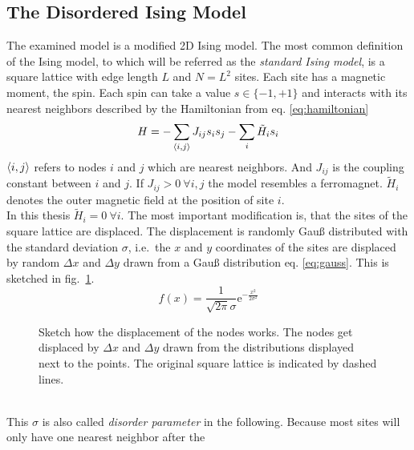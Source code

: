 \subsection{The Disordered Ising Model}
\label{ssec:isingmodel}
    The examined model is a modified 2D Ising model.
    The most common definition of the Ising model, to which will be referred
    as the \emph{standard Ising model}, is a square lattice with edge length \(L\) and
    \(N=L^2\) sites. Each site has a magnetic moment, the spin. Each
    spin can take a value \(s \in \{-1,+1\}\) and interacts with its
    nearest neighbors described by the Hamiltonian from eq. \eqref{eq:hamiltonian}
    \begin{equation}
        H = - \sum_{\left< i,j \right>}J_{ij}s_{i}s_{j} - \sum_i \tilde{H}_i s_i
        \label{eq:hamiltonian}
    \end{equation}
    \(\left< i,j \right>\) refers to nodes \(i\) and \(j\) which are nearest
    neighbors. And \(J_{ij}\) is the coupling constant between \(i\) and
    \(j\). If \(J_{ij} > 0 \ \forall i,j\) the model resembles a ferromagnet.
    \(\tilde{H}_i\) denotes the outer magnetic field at the position of
    site \(i\).\\
    In this thesis \(\tilde{H}_i=0 \ \forall i\). The most important
    modification is, that the sites of the square lattice are displaced.
    The displacement is randomly Gauß distributed with the standard
    deviation \(\sigma\), i.e.\ the \(x\) and \(y\) coordinates of the
    sites are displaced by random \(\Delta x\) and \(\Delta y\) drawn
    from a Gauß distribution eq. \eqref{eq:gauss}.
    This is sketched in fig.\ \ref{fig:displacement}.
    \begin{equation}
        f(x)=\frac{1}{\sqrt{2\pi}\sigma}\mathrm{e}^{-\frac{x^2}{2\sigma^2}}
        \label{eq:gauss}
    \end{equation}
    \begin{figure}[htbp]
        \centering
        
        \caption[Sketch how the Displacement Works]
        {
            Sketch how the displacement of the nodes works. The nodes
            get displaced by \(\Delta x\) and \(\Delta y\) drawn from the
            distributions displayed next to the points. The original
            square lattice is indicated by dashed lines.
        }
        \label{fig:displacement}
    \end{figure}\\
    This \(\sigma\) is also called \emph{disorder parameter} in the following.
    Because most sites will only have one nearest neighbor after the

